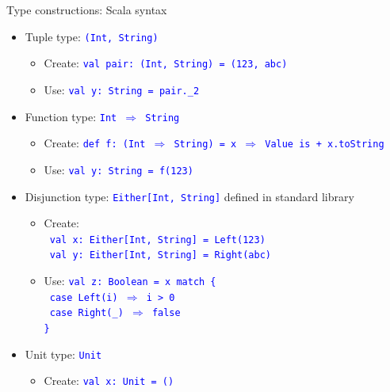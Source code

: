 \documentclass[english]{beamer}
\begin{document}
\begin{frame}{Type constructions: Scala syntax}

\begin{itemize}
\item Tuple type: \texttt{\textcolor{blue}{\footnotesize{}(Int, String)}}{\footnotesize \par}
\begin{itemize}
\item Create: \texttt{\textcolor{blue}{\footnotesize{}val pair:\ (Int,
String) = (123, \textquotedbl{}abc\textquotedbl{})}} 
\item Use: \texttt{\textcolor{blue}{\footnotesize{}val y:\ String = pair.\_2}}{\footnotesize \par}
\end{itemize}
\item Function type: \texttt{\textcolor{blue}{\footnotesize{}Int $\Rightarrow$
String}}{\footnotesize \par}
\begin{itemize}
\item Create: \texttt{\textcolor{blue}{\footnotesize{}def f:\ (Int $\Rightarrow$
String) = x $\Rightarrow$ \textquotedbl{}Value is \textquotedbl{}
+ x.toString}} 
\item Use: \texttt{\textcolor{blue}{\footnotesize{}val y:\ String = f(123)}}{\footnotesize \par}
\end{itemize}
\item Disjunction type: \texttt{\textcolor{blue}{\footnotesize{}Either{[}Int,
String{]}}} defined in standard library
\begin{itemize}
\item Create:\\
 \texttt{\textcolor{blue}{\footnotesize{}\ val x:\ Either{[}Int,
String{]} = Left(123)}}~\\
\texttt{\textcolor{blue}{\footnotesize{} val y:\ Either{[}Int, String{]}
= Right(\textquotedbl{}abc\textquotedbl{})}}{\footnotesize \par}
\item Use: \texttt{\textcolor{blue}{\footnotesize{}val z:\ Boolean = x
match \{}}~\\
\texttt{\textcolor{blue}{\footnotesize{} case Left(i) $\Rightarrow$
i > 0}}~\\
\texttt{\textcolor{blue}{\footnotesize{} case Right(\_) $\Rightarrow$
false}}~\\
\texttt{\textcolor{blue}{\footnotesize{}\}}}{\footnotesize \par}
\end{itemize}
\item Unit type: \texttt{\textcolor{blue}{\footnotesize{}Unit}}{\footnotesize \par}
\begin{itemize}
\item Create: \texttt{\textcolor{blue}{\footnotesize{}val x:\ Unit = ()}}{\footnotesize \par}
\end{itemize}
\end{itemize}
\end{frame}
\end{document}
